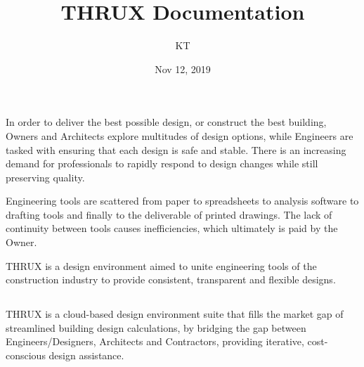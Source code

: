 \documentclass[letterpaper,10pt,english]{sphinxmanual}
\title{THRUX Documentation}
\date{Nov 12, 2019}
\author{KT}
\begin{document}
\pagestyle{empty}
\sphinxmaketitle
\pagestyle{plain}
\sphinxtableofcontents
\pagestyle{normal}
\label{\detokenize{docs/index::doc}}



\chapter{}
\label{\detokenize{docs/introduction/index-thrux:introduction}}\label{\detokenize{docs/introduction/index-thrux::doc}}
In order to deliver the best possible design, or construct the best building, Owners and Architects explore multitudes of design options, while Engineers are tasked with ensuring that each design is safe and stable.  There is an increasing demand for professionals to rapidly respond to design changes while still preserving quality.

Engineering tools are scattered from paper to spreadsheets to analysis software to drafting tools and finally to the deliverable of printed drawings.  The lack of continuity between tools causes inefficiencies, which ultimately is paid by the Owner.

THRUX is a design environment aimed to unite engineering tools of the construction industry to provide consistent, transparent and flexible designs.


\section{}
\label{\detokenize{docs/introduction/index-thrux:what-is-thrux}}
THRUX is a cloud-based design environment suite that fills the market gap of streamlined building design calculations, by bridging the gap between Engineers/Designers, Architects and Contractors, providing iterative, cost-conscious design assistance.
\end{document}
